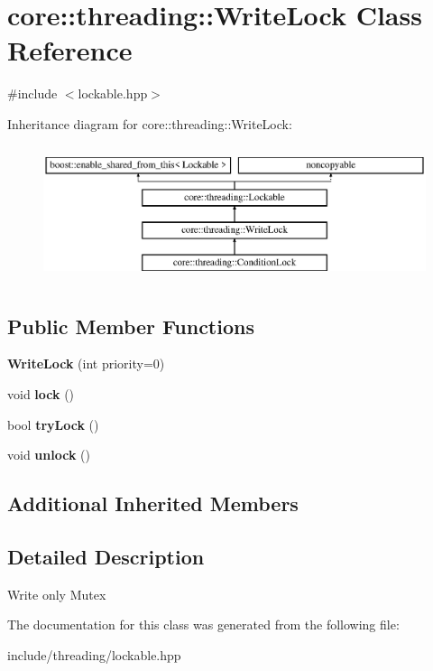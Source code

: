 \hypertarget{classcore_1_1threading_1_1_write_lock}{\section{core\-:\-:threading\-:\-:Write\-Lock Class Reference}
\label{classcore_1_1threading_1_1_write_lock}
}


{\ttfamily \#include $<$lockable.\-hpp$>$}

Inheritance diagram for core\-:\-:threading\-:\-:Write\-Lock\-:\begin{figure}[H]
\begin{center}
\leavevmode
\includegraphics[height=4.000000cm]{classcore_1_1threading_1_1_write_lock}
\end{center}
\end{figure}
\subsection*{Public Member Functions}
\begin{DoxyCompactItemize}
\item 
\hypertarget{classcore_1_1threading_1_1_write_lock_a6bdd6bc9804ad12a44def52e789db21a}{{\bfseries Write\-Lock} (int priority=0)}\label{classcore_1_1threading_1_1_write_lock_a6bdd6bc9804ad12a44def52e789db21a}

\item 
\hypertarget{classcore_1_1threading_1_1_write_lock_a9a5a57495dfb387398c48e6243c7c4b1}{void {\bfseries lock} ()}\label{classcore_1_1threading_1_1_write_lock_a9a5a57495dfb387398c48e6243c7c4b1}

\item 
\hypertarget{classcore_1_1threading_1_1_write_lock_aef32fc8f2258c36aae9b84bfc071ec03}{bool {\bfseries try\-Lock} ()}\label{classcore_1_1threading_1_1_write_lock_aef32fc8f2258c36aae9b84bfc071ec03}

\item 
\hypertarget{classcore_1_1threading_1_1_write_lock_a08ea89ae546eb19d411974ed8683fe99}{void {\bfseries unlock} ()}\label{classcore_1_1threading_1_1_write_lock_a08ea89ae546eb19d411974ed8683fe99}

\end{DoxyCompactItemize}
\subsection*{Additional Inherited Members}


\subsection{Detailed Description}
Write only Mutex 

The documentation for this class was generated from the following file\-:\begin{DoxyCompactItemize}
\item 
include/threading/lockable.\-hpp\end{DoxyCompactItemize}
